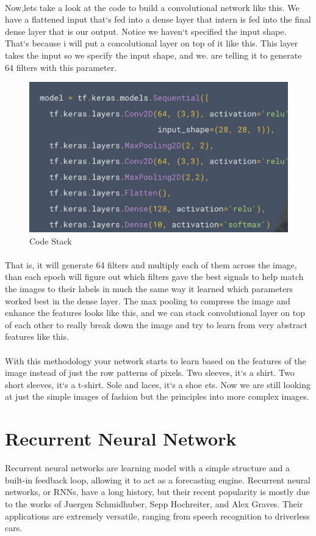 \documentclass{article}
\begin{document}
    \paragraph{}
    Now,lets take a look at the code to build a convolutional network like this. We have a flattened input that`s fed into a dense layer that intern is fed into the final dense layer that is our output. Notice we haven`t specified the input shape. That`s because i will put a concolutional layer on top of it like this. This layer takes the input so we specify the input shape, and we. are telling it to generate 64 filters with this parameter.
    \vspace{10mm}
    \begin{figure}[h!]
      \includegraphics[width=0.4\linewidth]{img/code-stack.png}
      \caption{Code Stack}
      \label{fig:snn}
    \end{figure}
    \paragraph{}
    That is, it will generate 64 filters and multiply each of them across the image, than each epoch will figure out which filters gave the best signals to help match the images to their labels in much the same way it learned which parameters worked best in the dense layer. The max pooling to compress the image and enhance the features looks like this, and we can stack convolutional layer on top of each other to really break down the image and try to learn from very abstract features like this.
    \paragraph{}
    With this methodology your network starts to learn based on the features of the image instead of just the row patterns of pixels. Two sleeves, it`s a shirt. Two short sleeves, it`s a t-shirt. Sole and laces, it`s a shoe ets. Now we are still looking at just the simple images of fashion but the principles into more complex images. 



  \newpage
  \section{Recurrent Neural Network}
  Recurrent neural networks are learning model with a simple structure and a built-in feedback loop, allowing it to act as a forecasting engine. 
  Recurrent neural networks, or RNNs, have a long history, but their recent popularity is mostly due to the works of Juergen Schmidhuber,  Sepp Hochreiter, and Alex Graves. Their applications are extremely versatile, ranging from speech recognition to driverless cars.
\end{document}

